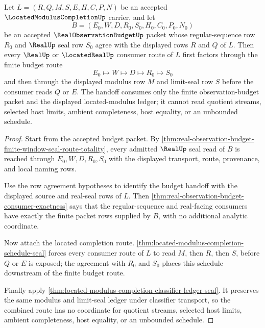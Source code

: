 \begin{theorem}
\label{thm:located-modulus-completion-observation-budget-handoff}
Let $L=(R,Q,M,S,E,H,C,P,N)$ be an accepted $\LocatedModulusCompletionUp$ carrier, and let
$$
B=(E_0,W,D,R_0,S_0,H_0,C_0,P_0,N_0)
$$
be an accepted $\RealObservationBudgetUp$ packet whose regular-sequence row $R_0$ and $\RealUp$ seal row $S_0$ agree with the displayed rows $R$ and $Q$ of $L$. Then every $\RealUp$ or $\LocatedRealUp$ consumer route of $L$ first factors through the finite budget route
$$
E_0 \longmapsto W \longmapsto D \longmapsto R_0 \longmapsto S_0
$$
and then through the displayed modulus row $M$ and limit-seal row $S$ before the consumer reads $Q$ or $E$. The handoff consumes only the finite observation-budget packet and the displayed located-modulus ledger; it cannot read quotient streams, selected host limits, ambient completeness, host equality, or an unbounded schedule.
\end{theorem}
\begin{proof}
Start from the accepted budget packet. By \autoref{thm:real-observation-budget-finite-window-seal-route-totality}, every admitted $\RealUp$ seal read of $B$ is reached through $E_0,W,D,R_0,S_0$ with the displayed transport, route, provenance, and local naming rows.

Use the row agreement hypotheses to identify the budget handoff with the displayed source and real-seal rows of $L$. Then \autoref{thm:real-observation-budget-consumer-exactness} says that the regular-sequence and real-facing consumers have exactly the finite packet rows supplied by $B$, with no additional analytic coordinate.

Now attach the located completion route. \autoref{thm:located-modulus-completion-schedule-seal} forces every consumer route of $L$ to read $M$, then $R$, then $S$, before $Q$ or $E$ is exposed; the agreement with $R_0$ and $S_0$ places this schedule downstream of the finite budget route.

Finally apply \autoref{thm:located-modulus-completion-classifier-ledger-seal}. It preserves the same modulus and limit-seal ledger under classifier transport, so the combined route has no coordinate for quotient streams, selected host limits, ambient completeness, host equality, or an unbounded schedule.
\end{proof}

